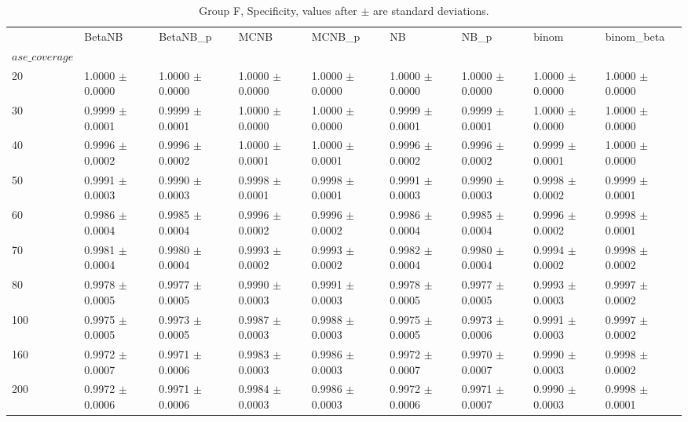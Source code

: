 \begin{table}[H]
\centering
\begin{adjustbox}{max width=\linewidth}
\begin{tabular}{lllllllll}
\toprule
 & BetaNB & BetaNB\_p & MCNB & MCNB\_p & NB & NB\_p & binom & binom\_beta \\
$ase\_coverage$ &  &  &  &  &  &  &  &  \\
\midrule
20 & 1.0000 $\pm$ 0.0000 & 1.0000 $\pm$ 0.0000 & 1.0000 $\pm$ 0.0000 & 1.0000 $\pm$ 0.0000 & 1.0000 $\pm$ 0.0000 & 1.0000 $\pm$ 0.0000 & 1.0000 $\pm$ 0.0000 & 1.0000 $\pm$ 0.0000 \\
30 & 0.9999 $\pm$ 0.0001 & 0.9999 $\pm$ 0.0001 & 1.0000 $\pm$ 0.0000 & 1.0000 $\pm$ 0.0000 & 0.9999 $\pm$ 0.0001 & 0.9999 $\pm$ 0.0001 & 1.0000 $\pm$ 0.0000 & 1.0000 $\pm$ 0.0000 \\
40 & 0.9996 $\pm$ 0.0002 & 0.9996 $\pm$ 0.0002 & 1.0000 $\pm$ 0.0001 & 1.0000 $\pm$ 0.0001 & 0.9996 $\pm$ 0.0002 & 0.9996 $\pm$ 0.0002 & 0.9999 $\pm$ 0.0001 & 1.0000 $\pm$ 0.0000 \\
50 & 0.9991 $\pm$ 0.0003 & 0.9990 $\pm$ 0.0003 & 0.9998 $\pm$ 0.0001 & 0.9998 $\pm$ 0.0001 & 0.9991 $\pm$ 0.0003 & 0.9990 $\pm$ 0.0003 & 0.9998 $\pm$ 0.0002 & 0.9999 $\pm$ 0.0001 \\
60 & 0.9986 $\pm$ 0.0004 & 0.9985 $\pm$ 0.0004 & 0.9996 $\pm$ 0.0002 & 0.9996 $\pm$ 0.0002 & 0.9986 $\pm$ 0.0004 & 0.9985 $\pm$ 0.0004 & 0.9996 $\pm$ 0.0002 & 0.9998 $\pm$ 0.0001 \\
70 & 0.9981 $\pm$ 0.0004 & 0.9980 $\pm$ 0.0004 & 0.9993 $\pm$ 0.0002 & 0.9993 $\pm$ 0.0002 & 0.9982 $\pm$ 0.0004 & 0.9980 $\pm$ 0.0004 & 0.9994 $\pm$ 0.0002 & 0.9998 $\pm$ 0.0002 \\
80 & 0.9978 $\pm$ 0.0005 & 0.9977 $\pm$ 0.0005 & 0.9990 $\pm$ 0.0003 & 0.9991 $\pm$ 0.0003 & 0.9978 $\pm$ 0.0005 & 0.9977 $\pm$ 0.0005 & 0.9993 $\pm$ 0.0003 & 0.9997 $\pm$ 0.0002 \\
100 & 0.9975 $\pm$ 0.0005 & 0.9973 $\pm$ 0.0005 & 0.9987 $\pm$ 0.0003 & 0.9988 $\pm$ 0.0003 & 0.9975 $\pm$ 0.0005 & 0.9973 $\pm$ 0.0006 & 0.9991 $\pm$ 0.0003 & 0.9997 $\pm$ 0.0002 \\
160 & 0.9972 $\pm$ 0.0007 & 0.9971 $\pm$ 0.0006 & 0.9983 $\pm$ 0.0003 & 0.9986 $\pm$ 0.0003 & 0.9972 $\pm$ 0.0007 & 0.9970 $\pm$ 0.0007 & 0.9990 $\pm$ 0.0003 & 0.9998 $\pm$ 0.0002 \\
200 & 0.9972 $\pm$ 0.0006 & 0.9971 $\pm$ 0.0006 & 0.9984 $\pm$ 0.0003 & 0.9986 $\pm$ 0.0003 & 0.9972 $\pm$ 0.0006 & 0.9971 $\pm$ 0.0007 & 0.9990 $\pm$ 0.0003 & 0.9998 $\pm$ 0.0001 \\
\bottomrule
\end{tabular}

\end{adjustbox}
\caption{Group F, Specificity, values after $\pm$ are standard deviations.}
\end{table}

